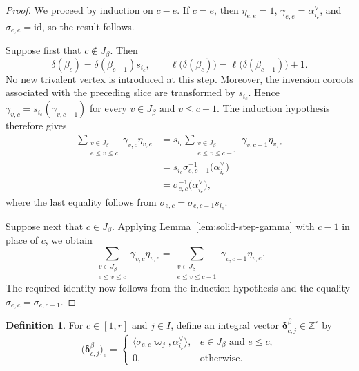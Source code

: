 \documentclass[12pt, reqno]{amsart}
\theoremstyle{plain}
\theoremstyle{definition}
\newtheorem{definition}[theorem]{Definition}
\numberwithin{equation}{section}
\newcommand{\ZZ}{\mathbb{Z}}
\begin{document}
\begin{proof}
We proceed by induction on \(c-e\). If \(c=e\), then
\(\eta_{e,e}=1\), \(\gamma_{e,e}=\alpha_{i_e}^\vee\), and
\(\sigma_{e,e}=\mathrm{id}\), so the result follows.

Suppose first that \(c\notin J_\beta\). Then
\[
 \delta(\beta_c)=\delta(\beta_{c-1})s_{i_c},
 \qquad
 \ell\bigl(\delta(\beta_c)\bigr)
 =
 \ell\bigl(\delta(\beta_{c-1})\bigr)+1.
\]
No new trivalent vertex is introduced at this step. Moreover, the
inversion coroots associated with the preceding slice are transformed
by \(s_{i_c}\). Hence
\(\gamma_{v,c}=s_{i_c}(\gamma_{v,c-1})\) for every \(v\in J_\beta \text{ and }v\leq c-1\).
The induction hypothesis therefore gives
\begin{align*}
 \sum_{\substack{v\in J_\beta\\e\leq v\leq c}}
 \gamma_{v,c}\eta_{v,e}
 &=
 s_{i_c}
 \sum_{\substack{v\in J_\beta\\e\leq v\leq c-1}}
 \gamma_{v,c-1}\eta_{v,e}                               \\
 &=
 s_{i_c}\sigma_{e,c-1}^{-1}
 \bigl(\alpha_{i_e}^\vee\bigr)                           \\
 &=
 \sigma_{e,c}^{-1}
 \bigl(\alpha_{i_e}^\vee\bigr),
\end{align*}
where the last equality follows from
\(\sigma_{e,c}=\sigma_{e,c-1}s_{i_c}\).

Suppose next that \(c\in J_\beta\). Applying
Lemma~\ref{lem:solid-step-gamma} with \(c-1\) in place of \(c\), we
obtain
\[
 \sum_{\substack{v\in J_\beta\\e\leq v\leq c}}
 \gamma_{v,c}\eta_{v,e}
 =
 \sum_{\substack{v\in J_\beta\\e\leq v\leq c-1}}
 \gamma_{v,c-1}\eta_{v,e}.
\]
The required identity now follows from the induction hypothesis and
the equality \(\sigma_{e,c}=\sigma_{e,c-1}\).
\end{proof}

\begin{definition}
\label{def:delta-beta-cj}
For \(c\in[1,r]\) and \(j\in I\), define an integral vector
\(\boldsymbol\delta_{c,j}^\beta\in\ZZ^r\) by
\begin{equation}
 \bigl(\boldsymbol\delta_{c,j}^\beta\bigr)_e
 =
 \begin{cases}
 \bigl\langle
 \sigma_{e,c}\varpi_j,\alpha_{i_e}^\vee
 \bigr\rangle,
 & e\in J_\beta\text{ and }e\leq c,\\[2mm]
 0,
 & \text{otherwise}.
 \end{cases}
\label{eq:delta-beta-cj}
\end{equation}
\end{definition}
\end{document}
